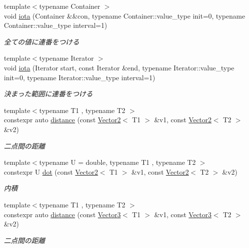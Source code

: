\begin{DoxyCompactItemize}
{\footnotesize template$<$typename Container $>$ }\\void \mbox{\hyperlink{namespacesaki_acfc6500ad8c06a88e04dd287c03bdeea}{iota}} (Container \&\&con, typename Container\+::value\+\_\+type init=0, typename Container\+::value\+\_\+type interval=1)
\begin{DoxyCompactList}\small\item\em 全ての値に連番をつける \end{DoxyCompactList}\item 
{\footnotesize template$<$typename Iterator $>$ }\\void \mbox{\hyperlink{namespacesaki_a60fc6028a57a55dcc37d01458997f7e3}{iota}} (Iterator start, const Iterator \&end, typename Iterator\+::value\+\_\+type init=0, typename Iterator\+::value\+\_\+type interval=1)
\begin{DoxyCompactList}\small\item\em 決まった範囲に連番をつける \end{DoxyCompactList}\item 
{\footnotesize template$<$typename T1 , typename T2 $>$ }\\constexpr auto \mbox{\hyperlink{namespacesaki_a75839f5ae2204d75bde7465607366a3b}{distance}} (const \mbox{\hyperlink{classsaki_1_1_vector2}{Vector2}}$<$ T1 $>$ \&v1, const \mbox{\hyperlink{classsaki_1_1_vector2}{Vector2}}$<$ T2 $>$ \&v2)
\begin{DoxyCompactList}\small\item\em 二点間の距離 \end{DoxyCompactList}\item 
{\footnotesize template$<$typename U  = double, typename T1 , typename T2 $>$ }\\constexpr U \mbox{\hyperlink{namespacesaki_a724d6c36d761314950d3ec8be6a4f4ab}{dot}} (const \mbox{\hyperlink{classsaki_1_1_vector2}{Vector2}}$<$ T1 $>$ \&v1, const \mbox{\hyperlink{classsaki_1_1_vector2}{Vector2}}$<$ T2 $>$ \&v2)
\begin{DoxyCompactList}\small\item\em 内積 \end{DoxyCompactList}\item 
{\footnotesize template$<$typename T1 , typename T2 $>$ }\\constexpr auto \mbox{\hyperlink{namespacesaki_a3e67ebd380889b661b2f72afc81ae005}{distance}} (const \mbox{\hyperlink{classsaki_1_1_vector3}{Vector3}}$<$ T1 $>$ \&v1, const \mbox{\hyperlink{classsaki_1_1_vector3}{Vector3}}$<$ T2 $>$ \&v2)
\begin{DoxyCompactList}\small\item\em 二点間の距離 \end{DoxyCompactList}\item 

\end{DoxyCompactItemize}
